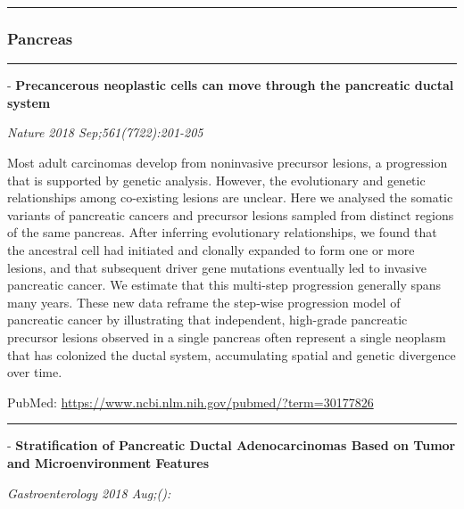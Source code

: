 \documentclass[]{article}
\begin{document}
\begin{center}\rule{0.5\linewidth}{\linethickness}\end{center}

\hypertarget{pancreas-2}{%
\subsubsection{Pancreas}\label{pancreas-2}}

\begin{center}\rule{0.5\linewidth}{\linethickness}\end{center}

 - \textbf{Precancerous neoplastic cells can move through the pancreatic
ductal system}

\emph{Nature 2018 Sep;561(7722):201-205}

Most adult carcinomas develop from noninvasive precursor lesions, a
progression that is supported by genetic analysis. However, the
evolutionary and genetic relationships among co-existing lesions are
unclear. Here we analysed the somatic variants of pancreatic cancers and
precursor lesions sampled from distinct regions of the same pancreas.
After inferring evolutionary relationships, we found that the ancestral
cell had initiated and clonally expanded to form one or more lesions,
and that subsequent driver gene mutations eventually led to invasive
pancreatic cancer. We estimate that this multi-step progression
generally spans many years. These new data reframe the step-wise
progression model of pancreatic cancer by illustrating that independent,
high-grade pancreatic precursor lesions observed in a single pancreas
often represent a single neoplasm that has colonized the ductal system,
accumulating spatial and genetic divergence over time.

PubMed: \url{https://www.ncbi.nlm.nih.gov/pubmed/?term=30177826}

{}

{}

\begin{center}\rule{0.5\linewidth}{\linethickness}\end{center}

 - \textbf{Stratification of Pancreatic Ductal Adenocarcinomas Based on
Tumor and Microenvironment Features}

\emph{Gastroenterology 2018 Aug;():}
\end{document}
